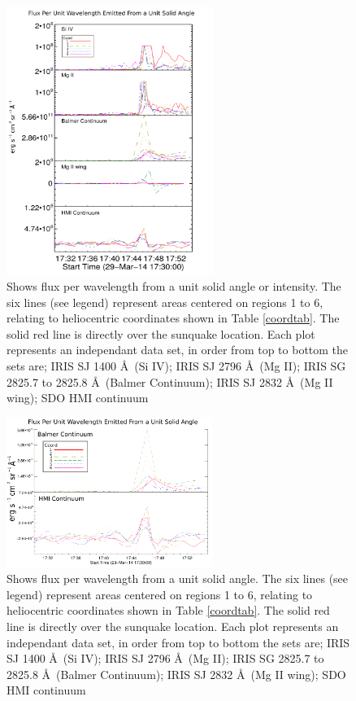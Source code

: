 \begin{figure}[H]
  \begin{center}
  \includegraphics[width=0.6\textwidth]{29-Mar-14-Flux-Ladder}
  \end{center}
  \caption{Shows flux per wavelength from a unit solid angle or intensity. The six lines (see legend) represent areas centered on regions 1 to 6, relating to heliocentric coordinates shown in Table \ref{coordtab}. The solid red line is directly over the sunquake location. Each plot represents an independant data set, in order from top to bottom the sets are; IRIS SJ 1400 \AA\ (Si IV); IRIS SJ 2796 \AA\ (Mg II); IRIS SG  2825.7 to 2825.8 \AA\ (Balmer Continuum); IRIS SJ 2832 \AA\ (Mg II wing); SDO HMI continuum}\label{fluxladder}
\end{figure}




\begin{figure}[H]
  \begin{center}
  \includegraphics[width=0.6\textwidth]{29-Mar-14-Flux-Ladder-Balm-HMI-Only}
  \end{center}
  \caption{Shows flux per wavelength from a unit solid angle. The six lines (see legend) represent areas centered on regions 1 to 6, relating to heliocentric coordinates shown in Table \ref{coordtab}. The solid red line is directly over the sunquake location. Each plot represents an independant data set, in order from top to bottom the sets are; IRIS SJ 1400 \AA\ (Si IV); IRIS SJ 2796 \AA\ (Mg II); IRIS SG  2825.7 to 2825.8 \AA\ (Balmer Continuum); IRIS SJ 2832 \AA\ (Mg II wing); SDO HMI continuum}\label{fluxladder-balm-hmi-only}
\end{figure}




